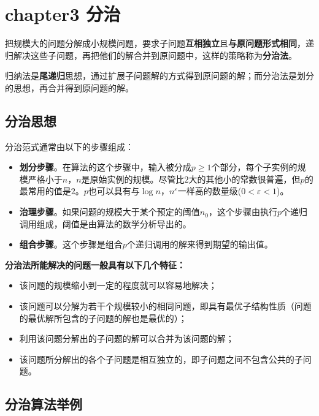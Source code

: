 \documentclass[./../main.tex]{subfiles}
\begin{document}
\section{chapter3 分治}
把规模大的问题分解成小规模问题，要求子问题\textbf{互相独立}且\textbf{与原问题形式相同}，递归解决这些子问题，再把他们的解合并到原问题中，这样的策略称为\textbf{分治法}。

归纳法是\textbf{尾递归}思想，通过扩展子问题解的方式得到原问题的解；而分治法是划分的思想，再合并得到原问题的解。


\subsection{分治思想}
分治范式通常由以下的步骤组成：
\begin{itemize}
    \item \textbf{划分步骤}。在算法的这个步骤中，输入被分成$p\geq1$个部分，每个子实例的规模严格小于$n$，$n$是原始实例的规模。尽管比$2$大的其他小的常数很普遍，但$p$的最常用的值是$2$。$p$也可以具有与$\log n$，$n^{\varepsilon}$一样高的数量级($0 < \varepsilon < 1$)。

    \item \textbf{治理步骤}。如果问题的规模大于某个预定的阈值$n_0$，这个步骤由执行$p$个递归调用组成，阈值是由算法的数学分析导出的。

    \item \textbf{组合步骤}。这个步骤是组合$p$个递归调用的解来得到期望的输出值。
\end{itemize}

\textbf{分治法所能解决的问题一般具有以下几个特征：}

\begin{itemize}
    \item 该问题的规模缩小到一定的程度就可以容易地解决；

    \item 该问题可以分解为若干个规模较小的相同问题，即具有最优子结构性质（问题的最优解所包含的子问题的解也是最优的）；

    \item 利用该问题分解出的子问题的解可以合并为该问题的解；

    \item 该问题所分解出的各个子问题是相互独立的，即子问题之间不包含公共的子问题。
\end{itemize}

\subsection{分治算法举例}
\end{document}

